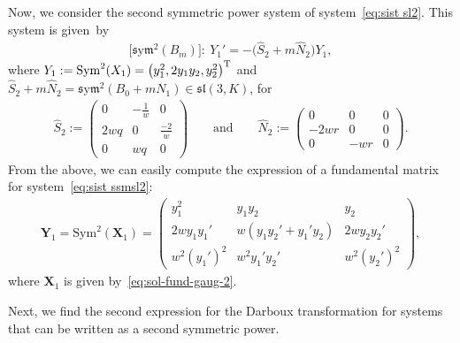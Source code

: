 \documentclass[pdftex]{sigma}%
\numberwithin{equation}{section}
\def\Sym{\mathrm{Sym}}
\def\sym{\mathfrak{s}\mathrm{y}\mathfrak{m}}
\begin{document}
Now, we consider the second symmetric power system of system~\eqref{eq:sist sl2}. This system is given~by
\begin{gather}\label{eq:sist ssmsl2}
\big[\sym^2 (B_m)\big]\colon \ Y_1'=-\big(\widehat{S}_2 + m \widehat{N}_2\big) Y_1 ,
\end{gather}
where $Y_1:= \Sym^2 ( X_1) = \big( y_1^2, 2y_1y_2 , y_2^2 \big)^{\rm T}$ and $\widehat{S}_2 + m \widehat{N}_2 =\sym^2 (B_0 +mN_1) \in \mathfrak{sl} (3,K)$, for
\begin{gather*}
\widehat{S}_2:=\begin{pmatrix} 	
0&- \frac{1}{w} &0\\ 2 wq&0&
\frac{-2}{w}\\ 0&wq&0
	\end{pmatrix} \qquad \text{and} \qquad
	\widehat{N}_2:=\begin{pmatrix}
	0&0&0\\ -2 wr&0&0
\\ 0&-wr&0
	\end{pmatrix}\!.
\end{gather*}
From the above, we can easily compute the expression of a fundamental matrix for system~\eqref{eq:sist ssmsl2}:
\begin{gather}\label{eq:sol-fund-sl-2}
 \mathbf{Y}_{1} = \Sym^2 ( \mathbf{X}_1) = \begin{pmatrix} y^2_1 & y_1 y_2 & y_2 \\[2pt] 2wy_1 y_1' & w(y_1 y_2' + y_1' y_2) & 2wy_2 y_2' \\[3pt] w^2 (y_1')^2 & w^2 y_1' y_2' & w^2 (y_2')^2 \end{pmatrix}\!,
\end{gather}
where $\mathbf{X}_1$ is given by~\eqref{eq:sol-fund-gaug-2}.

Next, we find the second expression for the Darboux transformation for systems that can be written as a second symmetric power.
\end{document}
